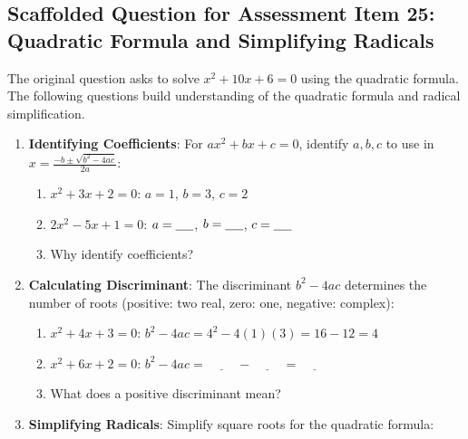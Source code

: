 \documentclass[12pt]{article}
\begin{document}
\subsection*{Scaffolded Question for Assessment Item 25: Quadratic Formula and Simplifying Radicals}
The original question asks to solve \( x^2 + 10x + 6 = 0 \) using the quadratic formula. The following questions build understanding of the quadratic formula and radical simplification.

\begin{enumerate}[label=25.\arabic*]
    \item \textbf{Identifying Coefficients}: For \( ax^2 + bx + c = 0 \), identify \( a, b, c \) to use in \( x = \frac{-b \pm \sqrt{b^2 - 4ac}}{2a} \):
    \begin{enumerate}[label=\alph*)]
        \item \( x^2 + 3x + 2 = 0 \): \( a = 1 \), \( b = 3 \), \( c = 2 \)
        \item \( 2x^2 - 5x + 1 = 0 \): \( a = \underline{\hspace{0.5cm}} \), \( b = \underline{\hspace{0.5cm}} \), \( c = \underline{\hspace{0.5cm}} \)
        \item Why identify coefficients? \underline{\hspace{6cm}}
    \end{enumerate}
    \item \textbf{Calculating Discriminant}: The discriminant \( b^2 - 4ac \) determines the number of roots (positive: two real, zero: one, negative: complex):
    \begin{enumerate}[label=\alph*)]
        \item \( x^2 + 4x + 3 = 0 \): \( b^2 - 4ac = 4^2 - 4(1)(3) = 16 - 12 = 4 \)
        \item \( x^2 + 6x + 2 = 0 \): \( b^2 - 4ac = \underline{\hspace{1cm}} - \underline{\hspace{1cm}} = \underline{\hspace{1cm}} \)
        \item What does a positive discriminant mean? \underline{\hspace{6cm}}
    \end{enumerate}
    \item \textbf{Simplifying Radicals}: Simplify square roots for the quadratic formula:
    \begin{enumerate}[label=\alph*)]

\end{enumerate}
\end{enumerate}
\end{document}

